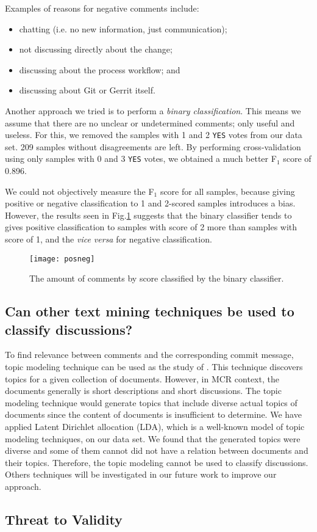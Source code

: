 Examples of reasons for negative comments include:

\begin{itemize}
	\item chatting (i.e. no new information, just communication);
	\item not discussing directly about the change;
	\item discussing about the process workflow; and
	\item discussing about Git or Gerrit itself.
\end{itemize}




Another approach we tried is to perform a \emph{binary classification}.
This means we assume that there are no unclear or undetermined comments; only useful and useless.
For this, we removed the samples with 1 and 2 \texttt{YES} votes from our data set. 209 samples without disagreements are left.
By performing cross-validation using only samples with 0 and 3 \texttt{YES} votes, we obtained a much better F$_1$ score of 0.896.

We could not objectively measure the F$_1$ score for all samples, because giving positive or negative classification to 1 and 2-scored samples introduces a bias.
However, the results seen in Fig.\ref{fig:binary} suggests that the binary classifier tends to gives positive classification to samples with score of 2 more than samples with score of 1, and the \emph{vice versa} for negative classification. 

\begin{figure}[h]
\centering
\texttt{[image: posneg]}
\caption{The amount of comments by score classified by the binary classifier.}
\label{fig:binary}
\end{figure}
\subsection*{Can other text mining techniques be used to classify discussions?}
To find relevance between comments and the corresponding commit message, topic modeling technique can be used as the study of \cite{Barua2012a}. This technique discovers topics for a given collection of documents. However, in MCR context, the documents generally is short descriptions and short discussions. 
The topic modeling technique would generate topics that include diverse actual topics of documents since the content of documents is insufficient to determine. We have applied Latent Dirichlet allocation (LDA), which is a well-known model of topic modeling techniques, on our data set. We found that the generated topics were diverse and some of them cannot did not have a relation between documents and their topics. Therefore, the topic modeling cannot be used to classify discussions. Others techniques will be investigated in our future work to improve our approach.

\subsection{Threat to Validity}
